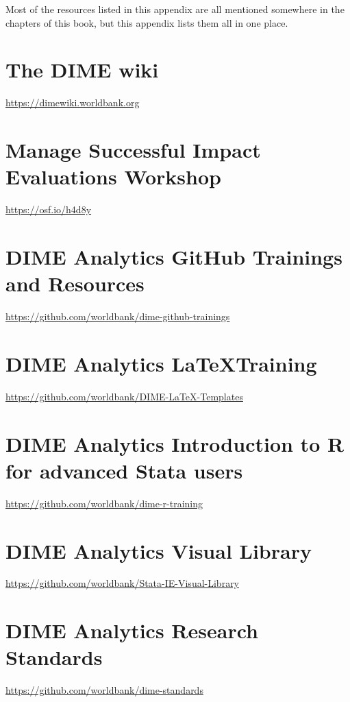 
\begin{fullwidth}

Most of the resources listed in this appendix are all mentioned somewhere in the chapters of this book, but this appendix lists them all in one place.

\end{fullwidth}




\section{The DIME wiki}

\url{https://dimewiki.worldbank.org}

\section{Manage Successful Impact Evaluations Workshop}

\url{https://osf.io/h4d8y}

\section{DIME Analytics GitHub Trainings and Resources }

\url{https://github.com/worldbank/dime-github-trainings}

\section{DIME Analytics \LaTeX Training}

\url{https://github.com/worldbank/DIME-LaTeX-Templates}

\section{DIME Analytics Introduction to R for advanced Stata users}

\url{https://github.com/worldbank/dime-r-training}

\section{DIME Analytics Visual Library}

\url{https://github.com/worldbank/Stata-IE-Visual-Library}

\section{DIME Analytics Research Standards}

\url{https://github.com/worldbank/dime-standards}


\mainmatter
